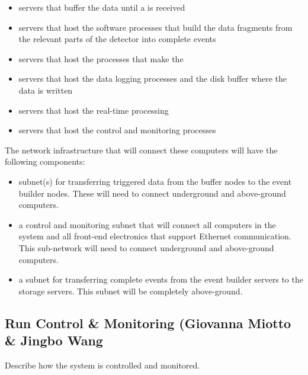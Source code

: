 \begin{itemize}
\item servers that buffer the data until a 
  is received
\item servers that host the software processes that
  build the data fragments from the relevant
  parts of the detector into complete events
\item servers that host the processes that make the
\item servers that host the data logging processes and
  the disk buffer where the data is written
\item servers that host the real-time  processing
\item servers that host the control and monitoring processes
\end{itemize}

The network infrastructure that will connect these computers
will have the following components:

\begin{itemize}
\item subnet(s) for transferring triggered data from the buffer
  nodes to the event builder nodes.  These will need to
  connect underground and above-ground computers.
\item a control and monitoring subnet that will connect all
  computers in the  system and all front-end
  electronics that support Ethernet communication.  This
  sub-network will need to connect underground and
  above-ground computers.
\item a subnet for transferring complete events from the
  event builder servers to the storage servers.  This subnet
  will be completely above-ground.
\end{itemize}

\subsection{Run Control \& Monitoring (Giovanna Miotto \& Jingbo Wang}
\label{sec:fdsp-daq-tcm}

Describe how the system is controlled and monitored.

